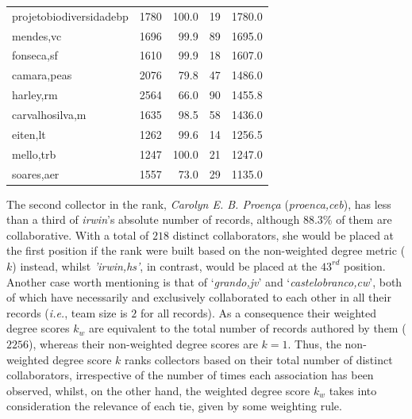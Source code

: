 \begin{table}[H]
\begin{center}
\begin{tabular}{l r r r r}
      projetobiodiversidadebp & 1780 & 100.0 & 19 & 1780.0 \\
      mendes,vc & 1696 & 99.9 & 89 & 1695.0 \\
      fonseca,sf & 1610 & 99.9 & 18 & 1607.0 \\
      camara,peas & 2076 & 79.8 & 47 & 1486.0 \\
      harley,rm & 2564 & 66.0 & 90 & 1455.8 \\
      carvalhosilva,m & 1635 & 98.5 & 58 & 1436.0 \\
      eiten,lt & 1262 & 99.6 & 14 & 1256.5 \\
      mello,trb & 1247 & 100.0 & 21 & 1247.0 \\
      soares,aer & 1557 & 73.0 & 29 & 1135.0 \\
      \hline
  \end{tabular}
  \label{table:ub_cwn_degree}
  \end{center}
\end{table}
%
The second collector in the rank, \textit{Carolyn E. B. Proença} (\textit{proenca,ceb}), has less than a third of \textit{irwin}'s absolute number of records, although $88.3\%$ of them are collaborative. 
With a total of $218$ distinct collaborators, she would be placed at the first position if the rank were built based on the non-weighted degree metric ($k$) instead, whilst \textit{'irwin,hs'}, in contrast, would be placed at the $43^{rd}$ position.
%
Another case worth mentioning is that of `\textit{grando,jv}' and `\textit{castelobranco,cw}', both of which have necessarily and exclusively collaborated to each other in all their records (\textit{i.e.}, team size is $2$ for all records).
As a consequence their weighted degree scores $k_w$ are equivalent to the total number of records authored by them ($2256$), whereas their non-weighted degree scores are $k=1$.
%
Thus, the non-weighted degree score $k$ ranks collectors based on their total number of distinct collaborators, irrespective of the  number of times each association has been observed, whilst, on the other hand, the weighted degree score $k_w$ takes into consideration the relevance of each tie, given by some weighting rule.

